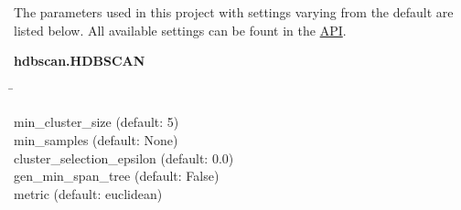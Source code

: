 The parameters used in this project with settings varying from the default are listed below. All available settings can be fount in the \href{https://hdbscan.readthedocs.io/en/latest/api.html}{API}.

\begin{leftbar}
    \textbf{hdbscan.HDBSCAN}
    \begin{nstabbing}
        \qquad\qquad\qquad\qquad\qquad\quad\=\kill

        min\_cluster\_size \> (default: 5)\\
        
        min\_samples \> (default: None)\\
        
        cluster\_selection\_epsilon \> (default: 0.0)\\
        
        gen\_min\_span\_tree \> (default: False)\\
        
        metric \> (default: euclidean)
    \end{nstabbing}
\end{leftbar}

